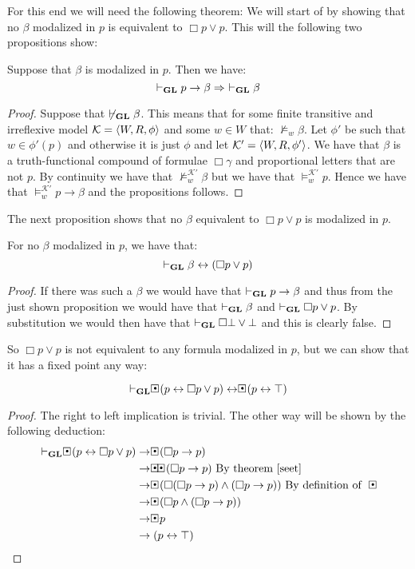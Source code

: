 \documentclass[../main.tex]{subfiles}
\begin{document}
For
this end we will need the following theorem:
We will start of by showing that no $\beta$ modalized in $p$ is equivalent to
$\Box p\vee p$. This will the following two propositions show:
\begin{prop}
	Suppose that $\beta$ is modalized in $p$. Then we have:
	\[\vdash_{\text{\textbf{GL}}} p\rightarrow\beta\Rightarrow\ \vdash_{\text{\textbf{GL}}}\beta\]
\end{prop}
\begin{proof}
	Suppose that $\not\vdash_{\text{\textbf{GL}}}\beta$. This means that for some finite
	transitive and irreflexive model $\mathcal{K}=\langle W,R,\phi\rangle$ and some $w\in W$ that:
	$\not\vDash_w\beta$. Let $\phi'$ be such that $w\in \phi'(p)$ and
	otherwise it is just $\phi$ and let $\mathcal{K}'=\langle W,R,\phi'\rangle$. We
	have that $\beta$ is a truth-functional compound of formulae
	$\Box\gamma$ and proportional letters that are not $p$. By continuity
	we have that $\not\vDash_w^{\mathcal{K}'}\beta$ but we have that
	$\vDash_w^{\mathcal{K}'}p$. Hence we have that
	$\vDash_w^{\mathcal{K}'}p\rightarrow\beta$ and the propositions follows.
\end{proof}
The next proposition shows that no $\beta$ equivalent to $\Box p\vee p$ is
modalized in $p$.
\begin{prop}
	For no $\beta$ modalized in $p$, we have that: 
	\[\vdash_{\text{\textbf{GL}}}\beta\leftrightarrow(\Box p\vee p)\]
\end{prop}
\begin{proof}
If there was such a $\beta$ we would have that $\vdash_{\text{\textbf{GL}}} p\rightarrow\beta$
and thus from the just shown proposition we would have that $\vdash_{\text{\textbf{GL}}}\beta$
and $\vdash_{\text{\textbf{GL}}}\Box p\vee p$. By substitution we would then have that
$\vdash_{\text{\textbf{GL}}}\Box\bot\vee\bot$ and this is clearly false.
\end{proof}
So $\Box p\vee p$ is not equivalent to any formula modalized in $p$, but we can
show that it has a fixed point any way:
\begin{prop}
	\[\vdash_\GL\sBox(p\leftrightarrow \Box p\vee
	p)\leftrightarrow\sBox(p\leftrightarrow\top)\]
\end{prop}
\begin{proof}
	The right to left implication is trivial. The other way will be shown
	by the following deduction:
	\begin{align*}
		\vdash_\GL\sBox(p\leftrightarrow\Box p\vee
		p)&\rightarrow\sBox(\Box p\rightarrow p)\\
		  &\rightarrow\sBox\sBox(\Box p\rightarrow p)\ \text{By
		  theorem \ref{seet}}\\
		  &\rightarrow\sBox (\Box(\Box p\rightarrow p)\wedge(\Box
		  p\rightarrow p))\ \text{By definition of}\ \sBox\\
		  &\rightarrow\sBox(\Box p\wedge(\Box p\rightarrow p))\\
		  &\rightarrow\sBox p\\
		  &\rightarrow (p\leftrightarrow \top)
	\end{align*}
\end{proof}
\end{document}
